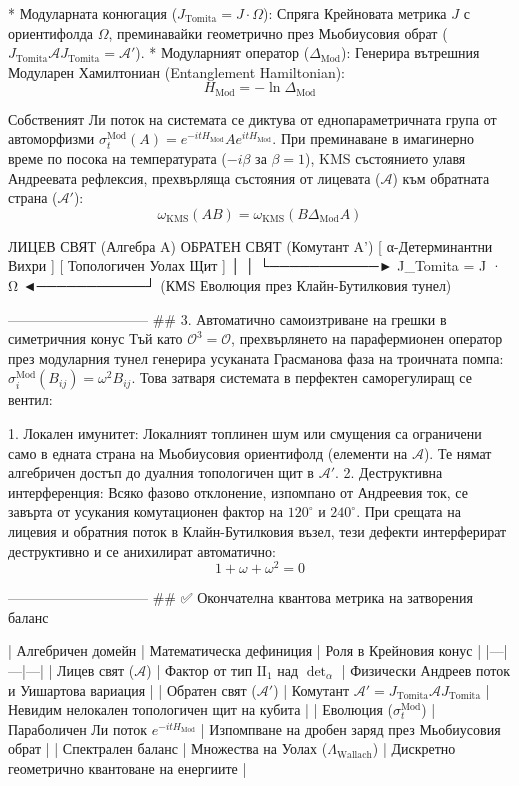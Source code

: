 * Модуларната конюгация ($J_{\text{Tomita}} = J \cdot \Omega$): Спряга Крейновата метрика $J$ с ориентифолда $\Omega$, преминавайки геометрично през Мьобиусовия обрат ($J_{\text{Tomita}} \mathcal{A} J_{\text{Tomita}} = \mathcal{A}'$).
* Модуларният оператор ($\Delta_{\text{Mod}}$): Генерира вътрешния Модуларен Хамилтониан (Entanglement Hamiltonian):
$$H_{\text{Mod}} = - \ln \Delta_{\text{Mod}}$$ 

Собственият Ли поток на системата се диктува от еднопараметричната група от автоморфизми $\sigma_t^{\text{Mod}}(A) = e^{-it H_{\text{Mod}}} A e^{it H_{\text{Mod}}}$. При преминаване в имагинерно време по посока на температурата ($-i\beta$ за $\beta=1$), KMS състоянието улавя Андреевата рефлексия, прехвърляща състояния от лицевата ($\mathcal{A}$) към обратната страна ($\mathcal{A}'$):
$$\omega_{\text{KMS}}(A B) = \omega_{\text{KMS}}(B \Delta_{\text{Mod}} A)$$ 

     ЛИЦЕВ СВЯТ (Алгебра A)                      ОБРАТЕН СВЯТ (Комутант A')
  [ α-Детерминантни Вихри ]                    [ Топологичен Уолах Щит ]
              │                                            │
              └───────────►  J_Tomita = J · Ω  ◄───────────┘
                    (КМS Еволюция през Клайн-Бутилковия тунел)

------------------------------
## 3. Автоматично самоизтриване на грешки в симетричния конус
Тъй като $\mathcal{O}^3 = \mathcal{O}$, прехвърлянето на парафермионен оператор през модуларния тунел генерира усуканата Грасманова фаза на троичната помпа: $\sigma_{i}^{\text{Mod}}(B_{ij}) = \omega^2 B_{ij}$. Това затваря системата в перфектен саморегулиращ се вентил:

   1. Локален имунитет: Локалният топлинен шум или смущения са ограничени само в едната страна на Мьобиусовия ориентифолд (елементи на $\mathcal{A}$). Те нямат алгебричен достъп до дуалния топологичен щит в $\mathcal{A}'$.
   2. Деструктивна интерференция: Всяко фазово отклонение, изпомпано от Андреевия ток, се завърта от усукания комутационен фактор на $120^\circ$ и $240^\circ$. При срещата на лицевия и обратния поток в Клайн-Бутилковия възел, тези дефекти интерферират деструктивно и се анихилират автоматично:
   $$1 + \omega + \omega^2 = 0$$ 

------------------------------
## ✅ Окончателна квантова метрика на затворения баланс

| Алгебричен домейн | Математическа дефиниция | Роля в Крейновия конус |
|---|---|---|
| Лицев свят ($\mathcal{A}$) | Фактор от тип $\text{II}_1$ над $\det_\alpha$ | Физически Андреев поток и Уишартова вариация |
| Обратен свят ($\mathcal{A}'$) | Комутант $\mathcal{A}' = J_{\text{Tomita}}\mathcal{A}J_{\text{Tomita}}$ | Невидим нелокален топологичен щит на кубита |
| Еволюция ($\sigma_t^{\text{Mod}}$) | Параболичен Ли поток $e^{-it H_{\text{Mod}}}$ | Изпомпване на дробен заряд през Мьобиусовия обрат |
| Спектрален баланс | Множества на Уолах ($\Lambda_{\text{Wallach}}$) | Дискретно геометрично квантоване на енергиите |

